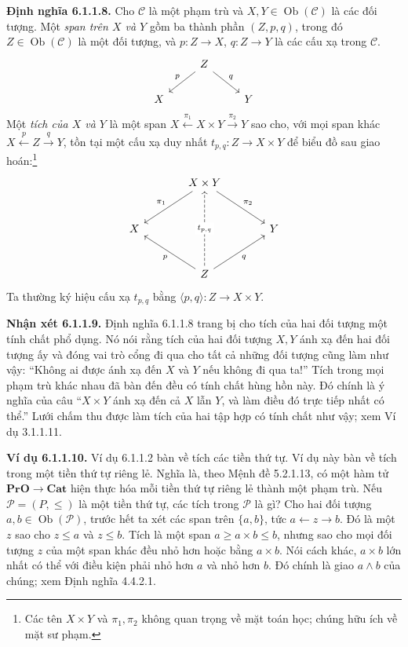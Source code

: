 \noindent\textbf{Định nghĩa 6.1.1.8.} Cho $\mathcal C$ là một phạm trù và $X,Y\in\operatorname{Ob}(\mathcal C)$ là các đối tượng. Một \emph{span trên $X$ và $Y$} gồm ba thành phần $(Z,p,q)$, trong đó $Z\in\operatorname{Ob}(\mathcal C)$ là một đối tượng, và
$p:Z\to X$, $q:Z\to Y$ là các cấu xạ trong $\mathcal C$.
\[\begin{tikzcd}&Z\arrow[dl,"p"']\arrow[dr,"q"]&\\X&&Y\end{tikzcd}\]
Một \emph{tích của $X$ và $Y$} là một span $X\xleftarrow{\pi_1}X\times Y\xrightarrow{\pi_2}Y$ sao cho, với mọi span khác $X\xleftarrow pZ\xrightarrow qY$, tồn tại một cấu xạ duy nhất $t_{p,q}:Z\to X\times Y$ để biểu đồ sau giao hoán:\footnote{Các tên $X\times Y$ và $\pi_1,\pi_2$ không quan trọng về mặt toán học; chúng hữu ích về mặt sư phạm.}
\[\begin{tikzcd}[column sep=large,row sep=large]&X\times Y\arrow[dl,"\pi_1"']\arrow[dr,"\pi_2"]&\\X&&Y\\&Z\arrow[ul,"p"]\arrow[ur,"q"']\arrow[uu,dashed,"t_{p,q}" description]&\end{tikzcd}\]
Ta thường ký hiệu cấu xạ $t_{p,q}$ bằng $\langle p,q\rangle:Z\to X\times Y$.

\noindent\textbf{Nhận xét 6.1.1.9.} Định nghĩa 6.1.1.8 trang bị cho tích của hai đối tượng một tính chất phổ dụng. Nó nói rằng tích của hai đối tượng $X,Y$ ánh xạ đến hai đối tượng ấy và đóng vai trò cổng đi qua cho tất cả những đối tượng cũng làm như vậy: ``Không ai được ánh xạ đến $X$ và $Y$ nếu không đi qua ta!'' Tích trong mọi phạm trù khác nhau đã bàn đến đều có tính chất hùng hồn này. Đó chính là ý nghĩa của câu ``$X\times Y$ ánh xạ đến cả $X$ lẫn $Y$, và làm điều đó trực tiếp nhất có thể.'' Lưới chấm thu được làm tích của hai tập hợp có tính chất như vậy; xem Ví dụ 3.1.1.11.

\noindent\textbf{Ví dụ 6.1.1.10.} Ví dụ 6.1.1.2 bàn về tích các tiền thứ tự. Ví dụ này bàn về tích trong một tiền thứ tự riêng lẻ. Nghĩa là, theo Mệnh đề 5.2.1.13, có một hàm tử $\mathbf{PrO}\to\mathbf{Cat}$ hiện thực hóa mỗi tiền thứ tự riêng lẻ thành một phạm trù. Nếu $\mathcal P=(P,\le)$ là một tiền thứ tự, các tích trong $\mathcal P$ là gì? Cho hai đối tượng $a,b\in\operatorname{Ob}(\mathcal P)$, trước hết ta xét các span trên $\{a,b\}$, tức $a\leftarrow z\to b$. Đó là một $z$ sao cho $z\le a$ và $z\le b$. Tích là một span $a\ge a\times b\le b$, nhưng sao cho mọi đối tượng $z$ của một span khác đều nhỏ hơn hoặc bằng $a\times b$. Nói cách khác, $a\times b$ lớn nhất có thể với điều kiện phải nhỏ hơn $a$ và nhỏ hơn $b$. Đó chính là giao $a\wedge b$ của chúng; xem Định nghĩa 4.4.2.1.

